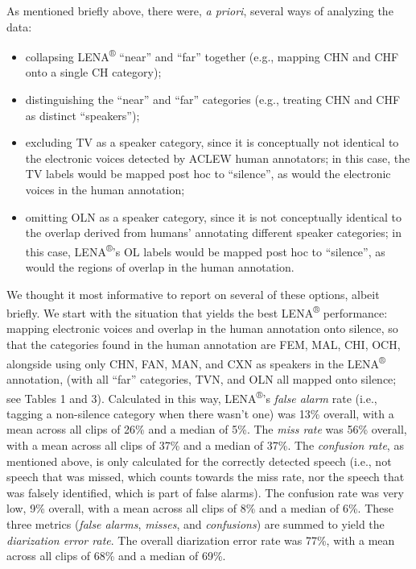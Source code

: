 \documentclass[english,floatsintext,man]{apa6}
\providecommand{\tightlist}{%
  \setlength{\itemsep}{0pt}\setlength{\parskip}{0pt}}
\begin{document}
As mentioned briefly above, there were, \emph{a priori}, several ways of
analyzing the data:

\begin{itemize}
\tightlist
\item
  collapsing LENA\textsuperscript{®} \enquote{near} and \enquote{far}
  together (e.g., mapping CHN and CHF onto a single CH category);
\item
  distinguishing the \enquote{near} and \enquote{far} categories (e.g.,
  treating CHN and CHF as distinct \enquote{speakers});
\item
  excluding TV as a speaker category, since it is conceptually not
  identical to the electronic voices detected by ACLEW human annotators;
  in this case, the TV labels would be mapped post hoc to
  \enquote{silence}, as would the electronic voices in the human
  annotation;
\item
  omitting OLN as a speaker category, since it is not conceptually
  identical to the overlap derived from humans' annotating different
  speaker categories; in this case, LENA\textsuperscript{®}'s OL labels
  would be mapped post hoc to \enquote{silence}, as would the regions of
  overlap in the human annotation.
\end{itemize}

We thought it most informative to report on several of these options,
albeit briefly. We start with the situation that yields the best
LENA\textsuperscript{®} performance: mapping electronic voices and
overlap in the human annotation onto silence, so that the categories
found in the human annotation are FEM, MAL, CHI, OCH, alongside using
only CHN, FAN, MAN, and CXN as speakers in the LENA\textsuperscript{®}
annotation, (with all \enquote{far} categories, TVN, and OLN all mapped
onto silence; see Tables 1 and 3). Calculated in this way,
LENA\textsuperscript{®}'s \emph{false alarm} rate (i.e., tagging a
non-silence category when there wasn't one) was 13\% overall, with a
mean across all clips of 26\% and a median of 5\%. The \emph{miss rate}
was 56\% overall, with a mean across all clips of 37\% and a median of
37\%. The \emph{confusion rate}, as mentioned above, is only calculated
for the correctly detected speech (i.e., not speech that was missed,
which counts towards the miss rate, nor the speech that was falsely
identified, which is part of false alarms). The confusion rate was very
low, 9\% overall, with a mean across all clips of 8\% and a median of
6\%. These three metrics (\emph{false alarms}, \emph{misses}, and
\emph{confusions}) are summed to yield the \emph{diarization error
rate}. The overall diarization error rate was 77\%, with a mean across
all clips of 68\% and a median of 69\%.
\end{document}
